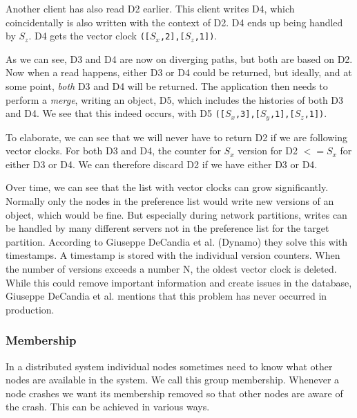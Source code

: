 Another client has also read D2 earlier. This client writes D4, which coincidentally is also written with the context of D2. D4 ends up being handled by $S_z$. D4 gets the vector clock \texttt{([$S_x$,2],[$S_z$,1])}.

As we can see, D3 and D4 are now on diverging paths, but both are based on D2.
Now when a read happens, either D3 or D4 could be returned, but ideally, and at some point, \emph{both} D3 and D4 will be returned.
The application then needs to perform a \emph{merge}, writing an object, D5, which includes the histories of both D3 and D4.
We see that this indeed occurs, with D5 \texttt{([$S_x$,3],[$S_y$,1],[$S_z$,1])}.

To elaborate, we can see that we will never have to return D2 if we are following vector clocks.
For both D3 and D4, the counter for $S_x$ version for D2 $<= S_x$ for either D3 or D4. We can therefore discard D2 if we have either D3 or D4.

Over time, we can see that the list with vector clocks can grow significantly. Normally only the nodes in the preference list would write new versions of an object, which would be fine. But especially during network partitions, writes can be handled by many different servers not in the preference list for the target partition.
According to Giuseppe DeCandia et al. (Dynamo)\cite{dynamo} they solve this with timestamps. A timestamp is stored with the individual version counters. 
When the number of versions exceeds a number N, the oldest vector clock is deleted.
While this could remove important information and create issues in the database, Giuseppe DeCandia et al.\cite{dynamo} mentions that this problem has never occurred in production.

\subsubsection{Membership}
In a distributed system individual nodes sometimes need to know what other nodes are available in the system. We call this group membership. Whenever a node crashes we want its membership removed so that other nodes are aware of the crash. This can be achieved in various ways. 

